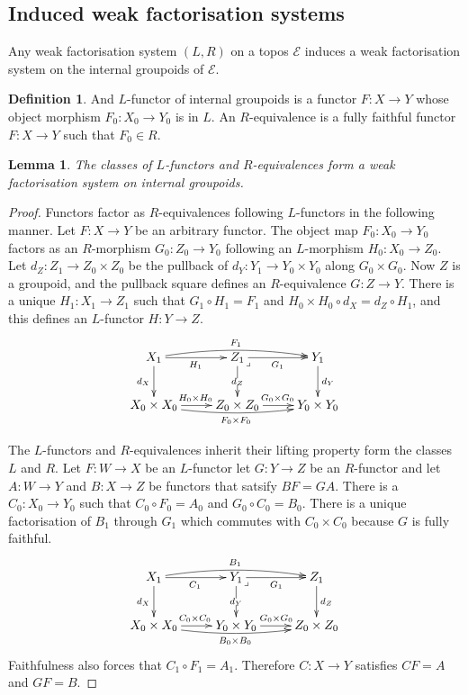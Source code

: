 \documentclass{amsart}
\theoremstyle{plain}
\newtheorem{lemma}[theorem]{Lemma}
\theoremstyle{definition}
\newtheorem{defin}[theorem]{Definition}
\newcommand\cat\mathcal
\begin{document}
\subsection{Induced weak factorisation systems}
Any weak factorisation system $(L,R)$ on a topos $\cat E$ induces a weak factorisation system on the internal groupoids of $\cat E$.

\begin{defin} And $L$-functor of internal groupoids is a functor $F:X\to Y$ whose object morphism $F_0:X_0\to Y_0$ is in $L$. An $R$-equivalence is a fully faithful functor $F:X\to Y$ such that $F_0\in R$. \end{defin}

\begin{lemma} The classes of $L$-functors and $R$-equivalences form a weak factorisation system on internal groupoids. \end{lemma}

\begin{proof} Functors factor as $R$-equivalences following $L$-functors in the following manner. Let $F:X\to Y$ be an arbitrary functor. The object map $F_0:X_0\to Y_0$ factors as an $R$-morphism $G_0:Z_0 \to Y_0$ following an $L$-morphism $H_0:X_0 \to Z_0$. Let $d_Z:Z_1 \to Z_0\times Z_0$ be the pullback of $d_Y:Y_1\to Y_0\times Y_0$ along $G_0\times G_0$. Now $Z$ is a groupoid, and the pullback square defines an $R$-equivalence $G:Z\to Y$. There is a unique $H_1:X_1 \to Z_1$ such that $G_1\circ H_1 = F_1$ and $H_0\times H_0\circ d_X = d_Z\circ H_1$, and this defines an $L$-functor $H:Y\to Z$.
\[ \xymatrix{
X_1\ar[d]_{d_X}\ar[r]_{H_1}\ar@/^/[rr]^{F_1} & Z_1 \ar[r]_{G_1} \ar[d]|{d_Z}\ar@{}[dr]|<\lrcorner & Y_1\ar[d]^{d_Y}\\
X_0\times X_0 \ar[r]^{H_0\times H_0}\ar@/_/[rr]_{F_0\times F_0} & Z_0\times Z_0 \ar[r]^{G_0\times G_0} & Y_0\times Y_0 
}\]

The $L$-functors and $R$-equivalences inherit their lifting property form the classes $L$ and $R$. Let $F:W\to X$ be an $L$-functor let $G:Y\to Z$ be an $R$-functor and let $A:W\to Y$ and $B:X\to Z$ be functors that satsify $BF=GA$. There is a $C_0:X_0 \to Y_0$ such that $C_0\circ F_0 = A_0$ and $G_0\circ C_0 = B_0$. There is a unique factorisation of $B_1$ through $G_1$ which commutes with $C_0\times C_0$ because $G$ is fully faithful.
\[ \xymatrix{
X_1\ar[d]_{d_X}\ar[r]_{C_1}\ar@/^/[rr]^{B_1} & Y_1 \ar[r]_{G_1} \ar[d]|{d_Y}\ar@{}[dr]|<\lrcorner & Z_1\ar[d]^{d_Z}\\
X_0\times X_0 \ar[r]^{C_0\times C_0}\ar@/_/[rr]_{B_0\times B_0} & Y_0\times Y_0 \ar[r]^{G_0\times G_0} & Z_0\times Z_0 
}\]
Faithfulness also forces that $C_1\circ F_1 = A_1$. Therefore $C:X\to Y$ satisfies $CF=A$ and $GF=B$.
\end{proof}
\end{document}
